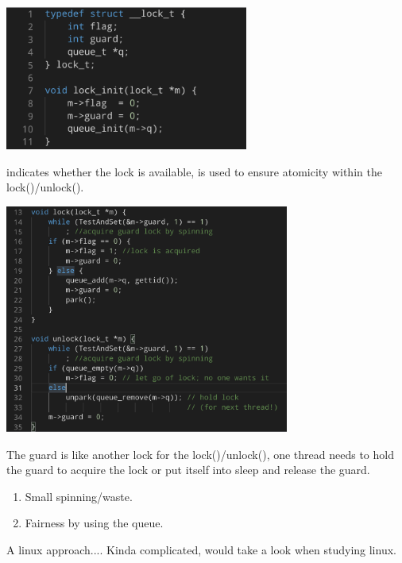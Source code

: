     \includegraphics[width=0.6\textwidth]{chapters/Cucurrency/Cucurrency/lock_init.png}

     indicates whether the lock is available,  is used to ensure atomicity within 
    the lock()/unlock().

    \includegraphics[width=0.7\textwidth]{chapters/Cucurrency/Cucurrency/park_unpark_approach.png}

    The guard is like another lock for the lock()/unlock(), one thread needs to hold the guard to acquire the 
    lock or put itself into sleep and release the guard.

    \vspace*{2mm}

    \begin{enumerate}
        \item Small spinning/waste.
        \item Fairness by using the queue.
    \end{enumerate}


    A linux approach.... Kinda complicated, would take a look when studying linux.
    
    
    







